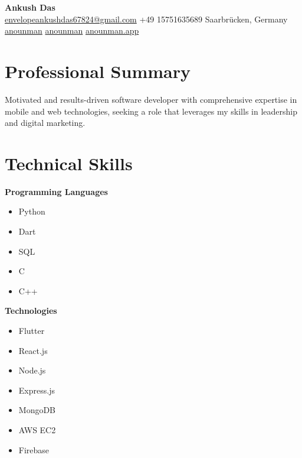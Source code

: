 \documentclass[a4paper,10pt]{article}
\begin{document}
\begin{center}
    \textbf{\Large Ankush Das} \\[0.2em]
    \small 
    \href{mailto:envelopeankushdas67824@gmail.com}{\faEnvelope{} envelopeankushdas67824@gmail.com} \quad 
    \faPhone{} +49 15751635689 \quad 
    \faMapMarker{} Saarbrücken, Germany \\[0.2em]
    \href{https://github.com/anounman}{\faGithub{} anounman} \quad 
    \href{https://linkedin.com/in/anounman}{\faLinkedin{} anounman} \quad 
    \href{https://anounman.app}{\faGlobe{} anounman.app}
\end{center}

\vspace{0.5em}

\begin{multicols}{2}
\section*{Professional Summary}
\justifying
Motivated and results-driven software developer with comprehensive expertise in mobile and web technologies, seeking a role that leverages my skills in leadership and digital marketing.

\section*{Technical Skills}
\vspace{-0.3em}
\hspace{1em}\textbf{Programming Languages}
\vspace{-0.2em}
\begin{itemize}[leftmargin=1em,itemsep=0.3em,parsep=0pt,label=$\bullet$]
    \item Python
    \item Dart
    \item SQL
    \item C
    \item C++
\end{itemize}

\vspace{0.3em}
\textbf{Technologies}
\vspace{-0.2em}
\begin{itemize}[leftmargin=1em,itemsep=0.3em,parsep=0pt,label=$\bullet$]
    \item Flutter
    \item React.js
    \item Node.js
    \item Express.js
    \item MongoDB
    \item AWS EC2
    \item Firebase
\end{itemize}


\end{multicols}
\end{document}
